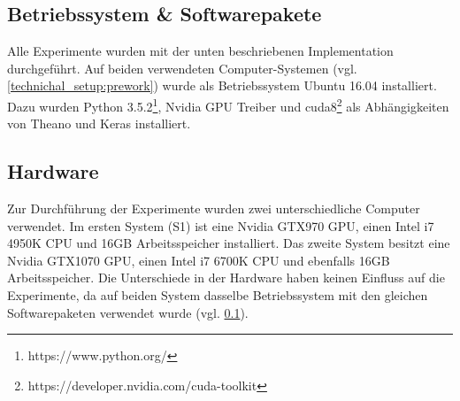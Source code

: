 \subsection{Betriebssystem \& Softwarepakete}
\label{technical_setup:software}
Alle Experimente wurden mit der unten beschriebenen Implementation durchgeführt. Auf beiden verwendeten Computer-Systemen (vgl. \ref{technichal_setup:prework}) wurde als Betriebssystem Ubuntu 16.04 installiert. Dazu wurden Python 3.5.2\footnote{https://www.python.org/}, Nvidia GPU Treiber und cuda8\footnote{https://developer.nvidia.com/cuda-toolkit} als Abhängigkeiten von Theano und Keras installiert.

\subsection{Hardware}
\label{technichal_setup:hardware}
Zur Durchführung der Experimente wurden zwei unterschiedliche Computer verwendet. Im ersten System (S1) ist eine Nvidia GTX970 GPU, einen Intel i7 4950K CPU und 16GB Arbeitsspeicher installiert. Das zweite System besitzt eine Nvidia GTX1070 GPU, einen Intel i7 6700K CPU und ebenfalls 16GB Arbeitsspeicher. Die Unterschiede in der Hardware haben keinen Einfluss auf die Experimente, da auf beiden System dasselbe Betriebssystem mit den gleichen Softwarepaketen verwendet wurde (vgl. \ref{technical_setup:software}).

